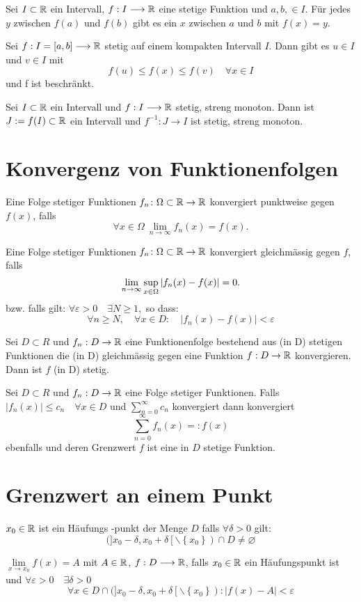 \Satz[Zwischenwertsatz] Sei $I \subset \mathbb{R}$ ein Intervall, $f: I \longrightarrow \mathbb{R}$ eine stetige Funktion und $a, b, \in I$. Für jedes $y$ zwischen $f(a)$ und $f(b)$ gibt es ein $x$ zwischen $a$ und $b$ mit $f(x)=y$.

 Sei $f: I=[a, b] \longrightarrow \mathbb{R}$ stetig auf einem kompakten Intervall $I$. Dann gibt es $u \in I$ und $v \in I$ mit
$$f(u) \leqslant f(x) \leqslant f(v) \quad \forall x \in I$$
und f ist beschränkt.

\Satz[Umkehrabbildung] Sei $I \subset \mathbb{R}$ ein Intervall und $f: I \longrightarrow \mathbb{R}$ stetig, streng monoton. Dann ist $J:=f(I) \subset \mathbb{R}$ ein Intervall und $f^{-1}: J \longrightarrow I$ ist stetig, streng monoton.

\section{Konvergenz von Funktionenfolgen}

\Def[Punktweise] Eine Folge stetiger Funktionen $f_n\colon\Omega\subset\mathbb{R}\to\mathbb{R}$
konvergiert punktweise gegen $f(x)$, falls
\[
\forall x\in\Omega \ \lim_{n\to\infty} f_n(x) = f(x).
\]

\Def[Gleichmässig] Eine Folge stetiger Funktionen $f_n\colon\Omega\subset\mathbb{R}\to\mathbb{R}$
konvergiert gleichmässig gegen $f$, falls
\[
\lim_{n\to\infty} \sup_{x\in\Omega} \left\lvert f_n(x)-f(x) \right\rvert = 0.
\]
bzw. falls gilt: $\forall \varepsilon>0  \quad \exists N \geqslant 1,$ so dass:
$$
\forall n \geqslant N, \quad \forall x \in D: \quad\left|f_{n}(x)-f(x)\right|<\varepsilon
$$

 Sei $D \subset R$ und $f_{n}: D \rightarrow \mathbb{R}$ eine Funktionenfolge bestehend aus (in
D) stetigen Funktionen die (in D) gleichmässig gegen eine Funktion $f: D \rightarrow \mathbb{R}$ konvergieren. Dann ist $f$ (in D) stetig.

 Sei $D \subset R$ und $f_{n}: D \rightarrow \mathbb{R}$ eine Folge stetiger Funktionen. Falls  $\left|f_{n}(x)\right| \leqslant c_{n} \quad \forall x \in D$ und $\sum_{n=0}^{\infty} c_{n}$ konvergiert dann konvergiert 
$$\sum\limits_{n=0}^{\infty} f_n(x)  =: f(x)$$
ebenfalls und deren Grenzwert $f$ ist eine in $D$ stetige Funktion.

\section{Grenzwert an einem Punkt}

\Def[Häufungspunkt] $x_{0} \in \mathbb{R}$ ist ein Häufungs -punkt der Menge $D$ falls $\forall \delta>0$ gilt:
$$(]x_{0}-\delta, x_{0}+\delta\left[\backslash\left\{x_{0}\right\}\right) \cap D \neq \varnothing$$

\Def[Grenzwert] $\lim \limits_{x \rightarrow x_0} f(x) = A$ 
mit $A \in \mathbb{R}$, $f: D \longrightarrow \mathbb{R}$, falls $x_0 \in \mathbb{R}$ ein Häufungspunkt ist und $\forall \varepsilon>0 \quad \exists \delta>0$
$$\forall x \in D \cap(] x_{0}-\delta, x_{0}+\delta\left[\backslash\left\{x_{0}\right\}\right):|f(x)-A|<\varepsilon$$


